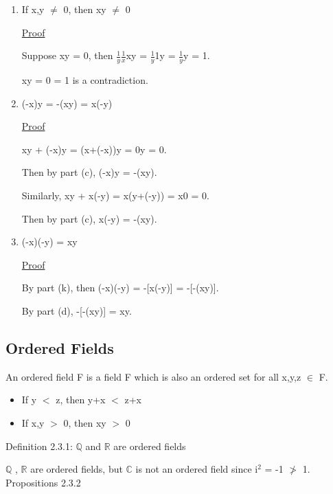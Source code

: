 \begin{enumerate}[label=(\alph*), leftmargin=2cm]
		\item If x,y $\not =$ 0, then xy $\not =$ 0

			{ \color{magenta} \underline{Proof} } 
		
				Suppose xy = 0, then $\frac{1}{y}\frac{1}{x}$xy
				= $\frac{1}{y}$1y = $\frac{1}{y}$y = 1.

				xy = 0 = 1 is a contradiction.
	
		\item (-x)y = -(xy) = x(-y)

			{ \color{magenta} \underline{Proof} } 
		
				xy + (-x)y = (x+(-x))y = 0y = 0.

				Then by part (c), (-x)y = -(xy).

				Similarly, xy + x(-y) = x(y+(-y)) = x0 = 0.
	
				Then by part (c), x(-y) = -(xy).

		\item (-x)(-y) = xy

			{ \color{magenta} \underline{Proof} } 
		
				By part (k), then (-x)(-y) = -[x(-y)] = -[-(xy)].

				By part (d), -[-(xy)] = xy.
	\end{enumerate}





\subsection{Ordered Fields}

	\qquad An ordered field F is a field F which is also an ordered set for all x,y,z $\in$ F.

	\begin{itemize}[leftmargin=2cm]
		\item If y $<$ z, then y+x $<$ z+x
	
		\item If x,y $>$ 0, then xy $>$ 0
	\end{itemize}

{ \color{blue} Definition 2.3.1: $ \mathbb{Q} $ and $ \mathbb{R} $ are ordered fields } 

	\qquad $ \mathbb{Q} $ , $ \mathbb{R} $ are ordered fields,
	but $ \mathbb{C} $ is not an ordered field since i$^2$ = -1 $\not >$ 1. \\

{ \color{blue} Propositions 2.3.2} 

